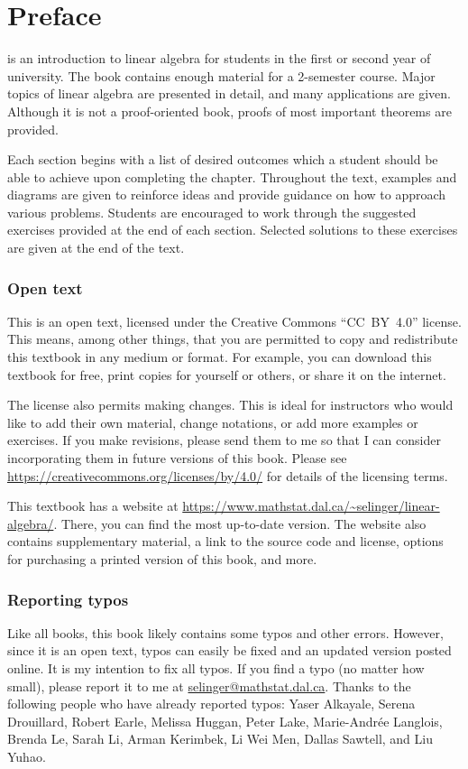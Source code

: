 \chapter*{Preface}

\textit{\bookfulltitle} is an introduction to linear algebra for
students in the first or second year of university. The book contains
enough material for a 2-semester course. Major topics of linear
algebra are presented in detail, and many applications are
given. Although it is not a proof-oriented book, proofs of most
important theorems are provided. 

Each section begins with a list of desired outcomes which a student
should be able to achieve upon completing the chapter.  Throughout the
text, examples and diagrams are given to reinforce ideas and provide
guidance on how to approach various problems. Students are encouraged
to work through the suggested exercises provided at the end of each
section. Selected solutions to these exercises are given at the end of
the text.

\subsection*{Open text}

This is an open text, licensed under the Creative Commons
``CC~BY~4.0'' license. This means, among other things, that you are
permitted to copy and redistribute this textbook in any medium or
format. For example, you can download this textbook for free, print
copies for yourself or others, or share it on the internet.

The license also permits making changes. This is ideal for instructors
who would like to add their own material, change notations, or add
more examples or exercises. If you make revisions, please send them to
me so that I can consider incorporating them in future versions of
this book. Please see
\url{https://creativecommons.org/licenses/by/4.0/} for details of the
licensing terms.

This textbook has a website at
\url{https://www.mathstat.dal.ca/~selinger/linear-algebra/}.  There,
you can find the most up-to-date version. The website also contains
supplementary material, a link to the source code and license, options
for purchasing a printed version of this book, and more.

\subsection*{Reporting typos}

Like all books, this book likely contains some typos and other
errors. However, since it is an open text, typos can easily be fixed
and an updated version posted online. It is my intention to fix all
typos. If you find a typo (no matter how small), please report it to
me at
\href{mailto:selinger@mathstat.dal.ca}{selinger@mathstat.dal.ca}. Thanks
to the following people who have already reported typos: Yaser
Alkayale, Serena Drouillard, Robert Earle, Melissa Huggan, Peter Lake,
Marie-Andr\'ee Langlois, Brenda Le, Sarah Li, Arman Kerimbek, Li Wei
Men, Dallas Sawtell, and Liu Yuhao.
